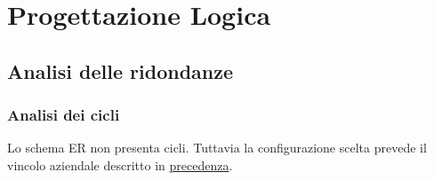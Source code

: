 \documentclass{article}
\begin{document}
\newpage

\section{Progettazione Logica}

\subsection{Analisi delle ridondanze}

\subsubsection{Analisi dei cicli}
Lo schema ER non presenta cicli.
\newline
Tuttavia la configurazione scelta prevede il vincolo aziendale descritto in \hyperlink{page.9}{precedenza}.
\end{document}
